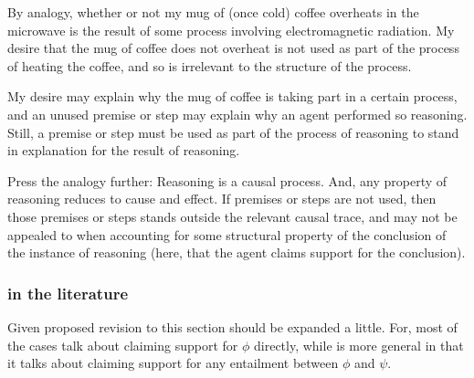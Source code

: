 \begin{note}[Analogy]
  By analogy, whether or not my mug of (once cold) coffee overheats in the microwave is the result of some process involving electromagnetic radiation.
  My desire that the mug of coffee does not overheat is not used as part of the process of heating the coffee, and so is irrelevant to the structure of the process.

  My desire may explain why the mug of coffee is taking part in a certain process, and an unused premise or step may explain why an agent performed so reasoning.
  Still, a premise or step must be used as part of the process of reasoning to stand in explanation for the result of reasoning.

  Press the analogy further: Reasoning is a causal process.
  And, any property of reasoning reduces to cause and effect.
  If premises or steps are not used, then those premises or steps stands outside the relevant causal trace, and may not be appealed to when accounting for some structural property of the conclusion of the instance of reasoning (here, that the agent claims support for the conclusion).
\end{note}

\subsubsection{\ESU{} in the literature}

\begin{note}
  \color{red}
  Given proposed revision to \ESU{} this section should be expanded a little.
  For, most of the cases talk about claiming support for \(\phi\) directly, while \ESU{} is more general in that it talks about claiming support for any entailment between \(\phi\) and \(\psi\).
\end{note}

